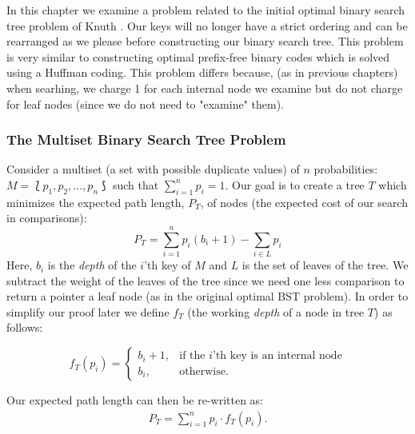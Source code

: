 \documentclass[]{beamer}
\theoremstyle{plain}
\begin{document}
\begin{frame}
In this chapter we examine a problem related to the initial optimal binary search tree problem of Knuth \cite{knuth1971optimum}. Our keys will no longer have a strict ordering and can be rearranged as we please before constructing our binary search tree. This problem is very similar to constructing optimal prefix-free binary codes which is solved using a Huffman coding. This problem differs because, (as in previous chapters) when searhing, we charge 1 for each internal node we examine but do not charge for leaf nodes (since we do not need to "examine" them).
\end{frame}


\begin{frame} \frametitle{The Multiset Binary Search Tree Problem}\label{The Multiset Binary Search Tree Problem}

 Consider a multiset (a set with possible duplicate values) of $n$ probabilities: $M = \lbag p_1, p_2, ..., p_n \rbag$ such that $\sum\limits_{i=1}^n p_i = 1$. Our goal is to create a tree $T$ which minimizes the expected path length, $P_T$, of nodes (the expected cost of our search in comparisons):
\begin{equation}
P_T = \sum_{i=1}^{n} p_i(b_i+1) - \sum_{i \in L}p_i
\end{equation}
Here, $b_i$ is the \emph{depth} of the $i$'th key of $M$ and $L$ is the set of leaves of the tree. We subtract the weight of the leaves of the tree since we need one less comparison to return a pointer a leaf node (as in the original optimal BST problem). In order to simplify our proof later we define $f_T$ (the working \emph{depth} of a node in tree $T$) as follows:
\begin{center}
\[
    f_T(p_i)= 
\begin{cases}
    b_i+1,& \text{if the } i \text{'th key is an internal node}\\
    b_i,              & \text{otherwise}.
\end{cases}
\]
\end{center}
Our expected path length can then be re-written as:
\begin{align*}
P_T = \sum_{i=1}^{n} p_i\cdot f_T(p_i).
\end{align*}
\end{frame}
\end{document}
